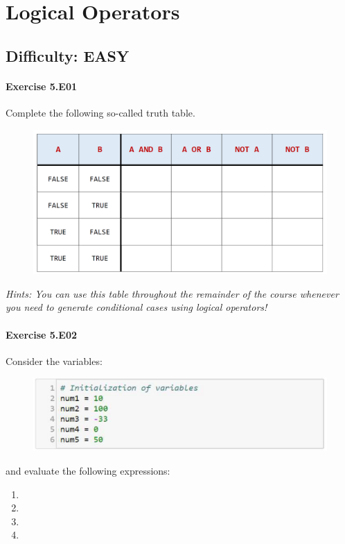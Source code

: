 \chapter{Logical Operators}\label{CHAP_LogicalOperators}

\section{Difficulty: EASY}


\subsubsection*{Exercise 5.E01}
Complete the following so-called truth table.
\begin{figure}[H]
		\centering
		\includegraphics[width=\textwidth]{../IMG/5E01.png} 
\end{figure}


\textit{Hints:
You can use this table throughout the remainder of the course whenever you need to
generate conditional cases using logical operators!}\\[1cm]


\newpage
\subsubsection*{Exercise 5.E02}
Consider the variables:
\begin{figure}[H]
		\centering
		\includegraphics[width=\textwidth]{../IMG/5E02.png} 
\end{figure}
and evaluate the following expressions:
\begin{enumerate}[label=(\alph*)]
	\item {}
	\item {}
	\item {}
	\item {}
\end{enumerate}
	

